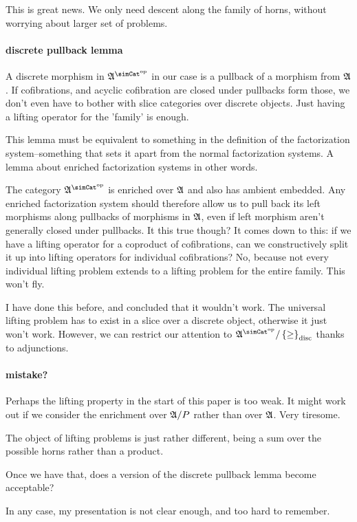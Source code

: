 \documentclass[csh.tex]{subfiles}
\begin{document}
This is great news. We only need descent along the family of horns, without worrying about larger set of problems.

\paragraph{discrete pullback lemma}
A discrete morphism in $\ambient\s$ in our case is a pullback of a morphism from $\mathfrak A$. If cofibrations, and acyclic cofibration are closed under pullbacks form those, we don't even have to bother with slice categories over discrete objects. Just having a lifting operator for the 'family' is enough.

This lemma must be equivalent to something in the definition of the factorization system--something that sets it apart from the normal factorization systems. A lemma about enriched factorization systems in other words.

The category $\ambient\s$ is enriched over $\mathfrak A$ and also has ambient embedded. Any enriched factorization system should therefore allow us to pull back its left morphisms along pullbacks of morphisms in $\mathfrak A$, even if left morphism aren't generally closed under pullbacks. It this true though? It comes down to this: if we have a lifting operator for a coproduct of cofibrations, can we constructively split it up into lifting operators for individual cofibrations? No, because not every individual lifting problem extends to a lifting problem for the entire family. This won't fly.

I have done this before, and concluded that it wouldn't work. The universal lifting problem has to exist in a slice over a discrete object, otherwise it just won't work. However, we can restrict our attention to $\ambient\s/\set\geq\disc$ thanks to adjunctions.


\paragraph{mistake?}
Perhaps the lifting property in the start of this paper is too weak. It might work out if we consider the enrichment over $\mathfrak A/P$ rather than over $\mathfrak A$. Very tiresome.

The object of lifting problems is just rather different,
being a sum over the possible horns rather than a product.

Once we have that, does a version of the discrete pullback lemma become acceptable?

In any case, my presentation is not clear enough, and too hard to remember.
\end{document}
